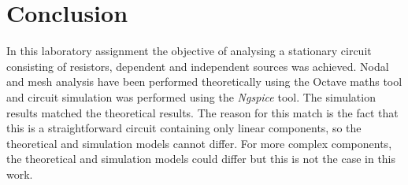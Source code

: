 \section{Conclusion}
\label{sec:conclusion}

In this laboratory assignment the objective of analysing a stationary circuit consisting of resistors, dependent and independent sources was achieved. Nodal and mesh analysis have been performed
theoretically using the Octave maths tool and circuit simulation was performed using the {\it Ngspice} tool. The simulation results matched the theoretical results. The reason for this match is the fact that this is a
straightforward circuit containing only linear components, so the theoretical
and simulation models cannot differ. For more complex components, the
theoretical and simulation models could differ but this is not the case in this
work.


